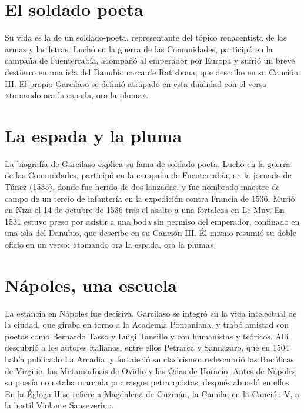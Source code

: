 \documentclass{book}
\begin{document}

\section{El soldado poeta}

Su vida es la de un soldado-poeta, representante del tópico renacentista de las armas y las letras. Luchó en la guerra de las Comunidades, participó en la campaña de Fuenterrabía, acompañó al emperador por Europa y sufrió un breve destierro en una isla del Danubio cerca de Ratisbona, que describe en su Canción III. El propio Garcilaso se definió atrapado en esta dualidad con el verso «tomando ora la espada, ora la pluma».


\section{La espada y la pluma}

La biografía de Garcilaso explica su fama de soldado poeta. Luchó en la guerra de las Comunidades, participó en la campaña de Fuenterrabía, en la jornada de Túnez (1535), donde fue herido de dos lanzadas, y fue nombrado maestre de campo de un tercio de infantería en la expedición contra Francia de 1536. Murió en Niza el 14 de octubre de 1536 tras el asalto a una fortaleza en Le Muy. En 1531 estuvo preso por asistir a una boda sin permiso del emperador, confinado en una isla del Danubio, que describe en su Canción III. Él mismo resumió su doble oficio en un verso: «tomando ora la espada, ora la pluma».


\section{Nápoles, una escuela}

La estancia en Nápoles fue decisiva. Garcilaso se integró en la vida intelectual de la ciudad, que giraba en torno a la Academia Pontaniana, y trabó amistad con poetas como Bernardo Tasso y Luigi Tansillo y con humanistas y teóricos. Allí descubrió a los autores italianos, entre ellos Petrarca y Sannazaro, que en 1504 había publicado La Arcadia, y fortaleció su clasicismo: redescubrió las Bucólicas de Virgilio, las Metamorfosis de Ovidio y las Odas de Horacio. Antes de Nápoles su poesía no estaba marcada por rasgos petrarquistas; después abundó en ellos. En la Égloga II se refiere a Magdalena de Guzmán, la Camila; en la Canción V, a la hostil Violante Sanseverino.
\end{document}
